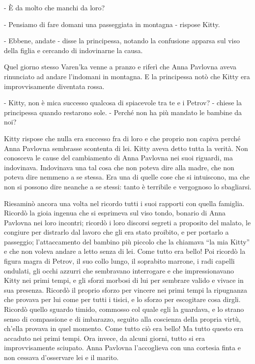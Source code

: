 - È da molto che manchi da loro? 

- Pensiamo di fare domani una passeggiata in montagna - rispose Kitty. 

- Ebbene, andate - disse la principessa, notando la confusione apparsa sul viso della figlia e cercando di indovinarne la causa. 

Quel giorno stesso Varen'ka venne a pranzo e riferì che Anna Pavlovna aveva rinunciato ad andare l'indomani in montagna. E la principessa notò che Kitty era improvvisamente diventata rossa. 

- Kitty, non è mica successo qualcosa di spiacevole tra te e i Petrov? - chiese la principessa quando restarono sole. - Perché non ha più mandato le bambine da noi? 

Kitty rispose che nulla era successo fra di loro e che proprio non capiva perché Anna Pavlovna sembrasse scontenta di lei. Kitty aveva detto tutta la verità. Non conosceva le cause del cambiamento di Anna Pavlovna nei suoi riguardi, ma indovinava. Indovinava una tal cosa che non poteva dire alla madre, che non poteva dire nemmeno a se stessa. Era una di quelle cose che si intuiscono, ma che non si possono dire neanche a se stessi: tanto è terribile e vergognoso lo sbagliarsi. 

Riesaminò ancora una volta nel ricordo tutti i suoi rapporti con quella famiglia. Ricordò la gioia ingenua che si esprimeva sul viso tondo, bonario di Anna Pavlovna nei loro incontri; ricordò i loro discorsi segreti a proposito del malato, le congiure per distrarlo dal lavoro che gli era stato proibito, e per portarlo a passeggio; l'attaccamento del bambino più piccolo che la chiamava ``la mia Kitty'' e che non voleva andare a letto senza di lei. Come tutto era bello! Poi ricordò la figura magra di Petrov, il suo collo lungo, il soprabito marrone, i radi capelli ondulati, gli occhi azzurri che sembravano interrogare e che impressionavano Kitty nei primi tempi, e gli sforzi morbosi di lui per sembrare valido e vivace in sua presenza. Ricordò il proprio sforzo per vincere nei primi tempi la ripugnanza che provava per lui come per tutti i tisici, e lo sforzo per escogitare cosa dirgli. Ricordò quello sguardo timido, commosso col quale egli la guardava, e lo strano senso di compassione e di imbarazzo, seguìto alla coscienza della propria virtù, ch'ella provava in quel momento. Come tutto ciò era bello! Ma tutto questo era accaduto nei primi tempi. Ora invece, da alcuni giorni, tutto si era improvvisamente sciupato. Anna Pavlovna l'accoglieva con una cortesia finta e non cessava d'osservare lei e il marito. 

